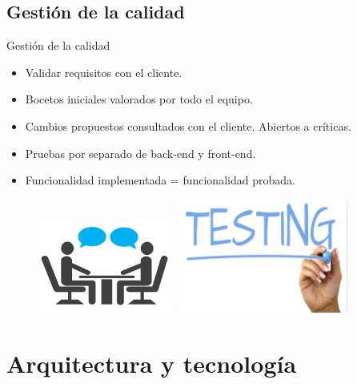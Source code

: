 \documentclass{beamer}
\begin{document}
\subsection{Gesti\'on de la calidad}
	\begin{frame}{Gesti\'on de la calidad}
		\begin{itemize}
			\item {
				Validar requisitos con el cliente.
			}
			\item {
				Bocetos iniciales valorados por todo el equipo.
			}
			\item {
				Cambios propuestos consultados con el cliente. Abiertos a cr\'iticas.
			}
			\item {
				Pruebas por separado de back-end y front-end.
			}
			\item {
				Funcionalidad implementada = funcionalidad probada.
				
			}
		\end{itemize}
		
		
		\begin{figure}
    		\includegraphics[width=0.4\textwidth, height=0.5\textheight]{images_latex/conversacion}
    		\hspace{0.7cm}
    		\includegraphics[width=0.5\textwidth, height=0.5\textheight]{images_latex/testing}
		\end{figure}
	
	\end{frame}

\section{Arquitectura y tecnolog\'ia}
\end{document}
